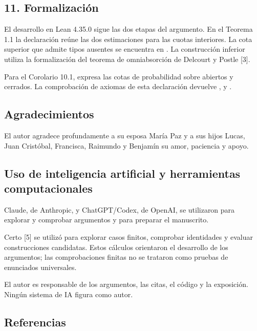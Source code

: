 \documentclass[spanish,11pt,a4paper]{article}
\begin{document}
\subsection{11. Formalización}\label{formalizaciuxf3n}

El desarrollo en Lean 4.35.0 sigue las dos etapas del argumento. En el Teorema 1.1 la declaración  reúne las dos estimaciones para las cuotas interiores. La cota superior que admite tipos ausentes se encuentra en . La construcción inferior utiliza la formalización del teorema de omniabsorción de Delcourt y Postle {[}3{]}.

Para el Corolario 10.1,  expresa las cotas de probabilidad sobre abiertos y cerrados. La comprobación de axiomas de esta declaración devuelve ,  y .

\subsection{Agradecimientos}\label{agradecimientos}

El autor agradece profundamente a su esposa María Paz y a sus hijos Lucas, Juan Cristóbal, Francisca, Raimundo y Benjamín su amor, paciencia y apoyo.

\subsection{Uso de inteligencia artificial y herramientas computacionales}\label{uso-de-inteligencia-artificial-y-herramientas-computacionales}

Claude, de Anthropic, y ChatGPT/Codex, de OpenAI, se utilizaron para explorar y comprobar argumentos y para preparar el manuscrito.

Certo {[}5{]} se utilizó para explorar casos finitos, comprobar identidades y evaluar construcciones candidatas. Estos cálculos orientaron el desarrollo de los argumentos; las comprobaciones finitas no se trataron como pruebas de enunciados universales.

El autor es responsable de los argumentos, las citas, el código y la exposición. Ningún sistema de IA figura como autor.

\subsection{Referencias}\label{referencias}
\raggedright
\end{document}
